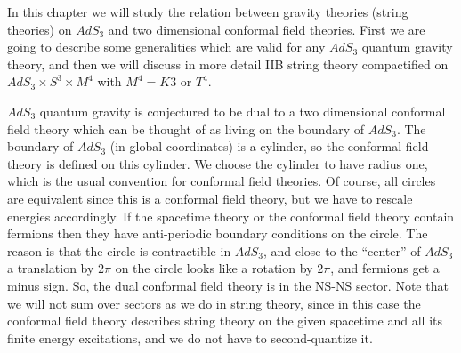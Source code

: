 

\def\ra{\rightarrow}
\def\quart{{1\over4}}
\def\p{\partial}
\def\ket#1{|#1\rangle}
\def\bra#1{\langle#1|}
\def\grad{\vec \nabla}
\def\bp{\bar \p}
\def\RN{Reissner-Nordstr\"om}
\def\apm{\alpha'}
\def\at{{\tilde \alpha}}
\def\s42{ 2^{-{1\over 4} } }
\def\shalf{{\scriptscriptstyle{1\over2}}}
\def\sign{{\rm sign}}
\def\csc{closed string channel}
\def\osc{open string channel}
\def\cL{{\cal L}}
\def\goto#1{\mathrel {\mathop {\longrightarrow} \limits_{#1}}}
\def\lr{\goto{r\to\infty}}
\def\exp{{\rm exp}}
\def\lb{\left\langle}
\def\rb{\right\rangle}
\def\ie{i\epsilon}
\def\ra{\rightarrow}
\def\propaga#1{\left({\theta_1(#1) \over \theta_4(#1)} \right) }
\def\propp{\left({\theta'_1(0) \over \theta_4(0)}\right) }
\def\g{\gamma}
\def\gb{\bar{\gamma}}
\def\a{\alpha}
\def\sa{r_0^2 {\rm sinh}^2\alpha }
\def\sg{r_0^2 {\rm sinh}^2\gamma }
\def\ss{r_0^2 {\rm sinh}^2\sigma }
\def\ca{r_0^2 {\rm cosh}^2\alpha }
\def\cg{r_0^2 {\rm cosh}^2\gamma }
\def\cs{r_0^2 {\rm cosh}^2\sigma }
\def\[{\left [}
\def\]{\right ]}
\def\({\left (}
\def\){\right )}
\def\b{\beta}






In this chapter we will study the relation between gravity theories
(string theories) on 
$AdS_3$ and two  dimensional conformal field theories. 
First we are going to describe some generalities which are valid for any
$AdS_3$ quantum gravity theory, and then we will discuss in more detail 
IIB string theory compactified on $AdS_3 \times S^3 \times M^4$ with 
$M^4 = K3$ or $T^4$. 

$AdS_3$ quantum gravity is conjectured to be dual to 
a two dimensional conformal field theory which can be thought of
as living on the boundary of $AdS_3$.
The boundary of $AdS_3$ (in global coordinates)
is a cylinder, so the conformal 
field theory is defined on this cylinder. We choose the cylinder to have 
radius one, which is the usual convention for conformal field theories.
 Of course, all circles are equivalent since
this is a conformal field theory, but we have to rescale energies
accordingly. If the spacetime theory or the conformal field theory contain
 fermions then they have anti-periodic boundary conditions 
 on the circle. The reason is that
the circle is contractible in $AdS_3$, 
 and close to the ``center'' of $AdS_3$ 
a translation by $2 \pi$ on the circle looks like a rotation
by $2 \pi$, and fermions get a minus sign. So, the dual conformal field
theory is in the NS-NS sector. Note that we 
will not sum over sectors as we
do in string theory, since in this case the conformal field theory 
describes string theory on
the given spacetime and all its finite energy excitations,
and we do not  have to 
second-quantize it. 

